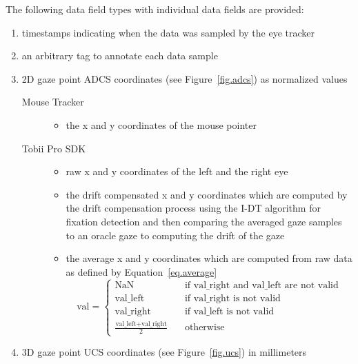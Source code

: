 \documentclass[a4paper,oneside]{book}
\begin{document}
The following data field types with individual data fields are provided:
\begin{enumerate}
    \item timestamps indicating when the data was sampled by the eye tracker
    \item an arbitrary tag to annotate each data sample
    \item 2D gaze point ADCS coordinates (see Figure~\ref{fig.adcs}) as normalized values
        \begin{description}
            \item[Mouse Tracker] \hfill
                \begin{itemize}
                    \item the x and y coordinates of the mouse pointer
                \end{itemize}
            \item[Tobii Pro SDK] \hfill
                \begin{itemize}
                    \item raw x and y coordinates of the left and the right eye
                    \item the drift compensated x and y coordinates which are computed by the drift compensation process using the I-DT algorithm for fixation detection and then comparing the averaged gaze samples to an oracle gaze to computing the drift of the gaze
                    \item the average x and y coordinates which are computed from raw data as defined by Equation~\ref{eq.average}
\begin{equation}
    \label{eq.average}
    \text{val} =
        \begin{cases}
            \text{NaN}                                      & \quad \text{if val\_right and val\_left are not valid}\\
            \text{val\_left}                                & \quad \text{if val\_right is not valid}\\
            \text{val\_right}                               & \quad \text{if val\_left is not valid}\\
            \frac{\text{val\_left} + \text{val\_right}}{2}  & \quad \text{otherwise}
        \end{cases}
\end{equation}
                \end{itemize}
        \end{description}
    \item 3D gaze point UCS coordinates (see Figure~\ref{fig.ucs}) in millimeters

\end{enumerate}
\end{document}
